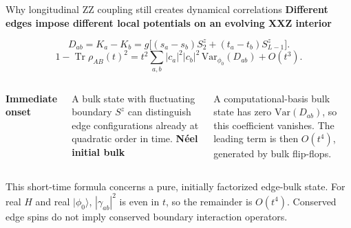 \documentclass[aspectratio=169,10pt]{beamer}
\newcommand{\Tr}{\operatorname{Tr}}
\newcommand{\ket}[1]{\lvert #1\rangle}
\newcommand{\sechead}[1]{{\color{sea}\bfseries #1}\par\vspace{1mm}}
\newcommand{\noteinline}[1]{{\color{muted}\footnotesize #1}}
\begin{document}
\begin{frame}{Why longitudinal ZZ coupling still creates dynamical correlations}
\sechead{Different edges impose different local potentials on an evolving XXZ interior}
\[
D_{ab}=K_a-K_b
=g\big[(s_a-s_b)S_2^z+(t_a-t_b)S_{L-1}^z\big].
\]
\[
\boxed{1-\Tr\rho_{AB}(t)^2
=t^2\sum_{a,b}|c_a|^2|c_b|^2\,\mathrm{Var}_{\phi_0}(D_{ab})+O(t^3).}
\]
\begin{columns}[T,onlytextwidth]
\sechead{Immediate onset}
A bulk state with fluctuating boundary \(S^z\) can distinguish edge configurations already at quadratic order in time.
\sechead{N\'eel initial bulk}
A computational-basis bulk state has zero \(\mathrm{Var}(D_{ab})\), so this coefficient vanishes. The leading term is then \(O(t^4)\), generated by bulk flip-flops.
\end{columns}
\vspace{.06cm}
\noteinline{This short-time formula concerns a pure, initially factorized edge-bulk state. For real \(H\) and real \(\ket{\phi_0}\), \(|\gamma_{ab}|^2\) is even in \(t\), so the remainder is \(O(t^4)\). Conserved edge spins do not imply conserved boundary interaction operators.}
\end{frame}
\end{document}
